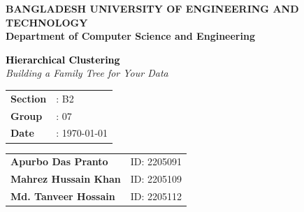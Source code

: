 \documentclass{article}
\begin{document}
\begin{titlepage}
    \centering
    \vspace*{1cm}
    
    
    \vspace{0.5cm}
    
    {\large \textbf{BANGLADESH UNIVERSITY OF ENGINEERING AND TECHNOLOGY}} \\
    {\large \textbf{Department of Computer Science and Engineering}}
    
    \vspace{1.5cm}
    
    {\Huge \textbf{\textcolor{black}{Hierarchical Clustering}}} \\
    \vspace{0.3cm}
    {\Large \textit{Building a Family Tree for Your Data}}
    
    \vspace{1.5cm}
    
    \begin{tabular}{ll}
        \textbf{Section} & : B2 \\
        \textbf{Group}   & : 07 \\
        \textbf{Date}    & : \today \\
    \end{tabular}
    
    \vspace{1.5cm}
    
    \begin{tabular}{ll}
        \textbf{Apurbo Das Pranto}   & ID: 2205091 \\
        \textbf{Mahrez Hussain Khan} & ID: 2205109 \\
        \textbf{Md. Tanveer Hossain} & ID: 2205112 \\
    \end{tabular}
    
\end{titlepage}
\end{document}

